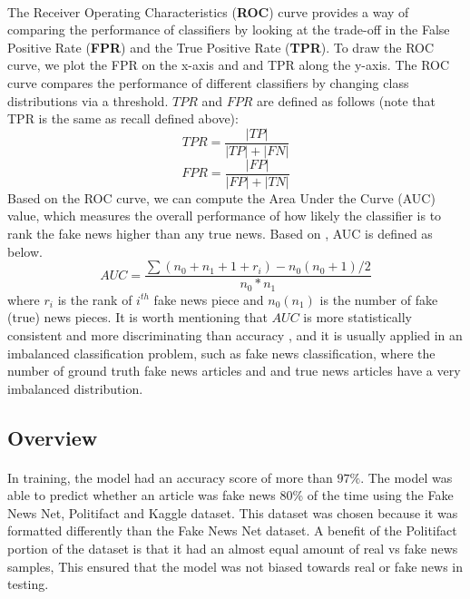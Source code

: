 \documentclass[11.5pt]{article}
\begin{document}
\begin{multicols}{2}
\paragraph{}
The Receiver Operating Characteristics (\textbf{ROC}) curve provides a way of comparing the performance of classiﬁers by looking at the trade-oﬀ in the False Positive Rate (\textbf{FPR}) and the True Positive Rate (\textbf{TPR}). To draw the ROC curve, we plot the FPR on the x-axis and and TPR along the y-axis. The ROC curve compares the performance of diﬀerent classiﬁers by changing class distributions via a threshold. $TPR$ and $FPR$ are deﬁned as follows (note that TPR is the same as recall deﬁned above):
\begin{equation}
    TPR = \frac{|TP|}{|TP|+|FN|}
\end{equation}
\begin{equation}
    FPR = \frac{|FP|}{|FP|+|TN|}
\end{equation}
Based on the ROC curve, we can compute the Area Under the Curve (AUC) value, which measures the overall performance of how likely the classiﬁer is to rank the fake news higher than any true news. Based on \cite{roc}, AUC is deﬁned as below.
\begin{equation}
    AUC = \frac{\sum (n_0 + n_1 + 1 + r_i) - n_0 (n_0 + 1)/2}{n_0 * n_1}
\end{equation}
where $r_i$ is the rank of $i^{th}$ fake news piece and $n_0 (n_1)$ is the number of fake (true) news pieces. It is worth mentioning that $AUC$ is more statistically consistent and more discriminating than accuracy \cite{stat_accuracy}, and it is usually applied in an imbalanced classiﬁcation problem, such as fake news classiﬁcation, where the number of ground truth fake news articles and and true news articles have a very imbalanced distribution.

\subsection{Overview}
\paragraph{}
In training, the model had an accuracy score of more than $97\%$. The model was able to predict whether an article was fake news 80\% of the time using the Fake News Net, Politifact and Kaggle dataset.
This dataset was chosen because it was formatted differently than the Fake News Net dataset. A beneﬁt of the Politifact portion of the dataset is that it had an almost equal amount of real vs fake news samples, This ensured that the model was not biased towards real or fake news in testing.


\end{multicols}
\end{document}
